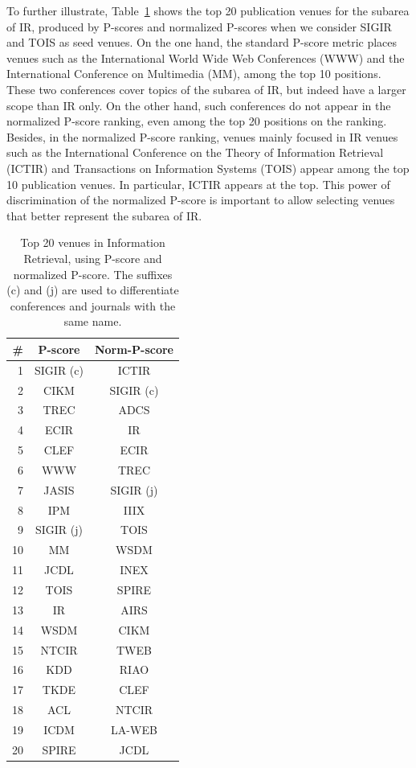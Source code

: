 \documentclass[msc]{ppgccufmg}
\begin{document}
To further illustrate, Table~\ref{tab:ir-venues} shows the top 20 publication venues for the subarea of IR, produced by P-scores and normalized P-scores when we consider SIGIR and TOIS as seed venues. 
%
On the one hand, the standard P-score metric places venues such as the International World Wide Web Conferences (WWW) and the International Conference on Multimedia (MM), among the top 10 positions. These two conferences cover topics of the subarea of IR, but indeed have a larger scope than IR only. 
%
On the other hand, such conferences do not appear in the normalized P-score ranking, even among the top 20 positions on the ranking. Besides, in the normalized P-score ranking, venues mainly focused in IR venues such as the International Conference on the Theory of Information Retrieval (ICTIR) and Transactions on Information Systems (TOIS) appear among the top 10 publication venues. In particular, ICTIR appears at the top. This power of discrimination of the normalized P-score is important to allow selecting venues that better represent the subarea of IR.

\begin{table}[htbp]
\centering
\caption{Top 20 venues in Information Retrieval, using P-score and normalized P-score. The suffixes (c) and (j) are used to differentiate conferences and journals with the same name.}
\label{tab:ir-venues}
\begin{tabular}{rcc}
	\toprule
	\#	& P-score 	& Norm-P-score \\ \hline
	1	& SIGIR (c)	& ICTIR \\ 
	2	& CIKM	        & SIGIR (c) \\ 
	3	& TREC	        & ADCS              \\ 
	4	& ECIR	& IR \\ 
	5	& CLEF	& ECIR \\ 
	6	& WWW	& TREC \\ 
	7	& JASIS	& SIGIR (j) \\ 
	8	& IPM	& IIIX \\ 
	9	& SIGIR	(j) & TOIS \\ 
	10	& MM	& WSDM \\ 
	11	& JCDL	& INEX \\ 
	12	& TOIS	& SPIRE \\ 
	13	& IR	& AIRS \\ 
	14	& WSDM	& CIKM \\ 
	15	& NTCIR	& TWEB \\ 
	16	& KDD	& RIAO \\ 
	17	& TKDE	& CLEF \\ 
	18	& ACL	& NTCIR \\ 
	19	& ICDM	& LA-WEB \\ 
	20	& SPIRE	& JCDL \\ 	
	\bottomrule
\end{tabular}
\end{table}
\end{document}
